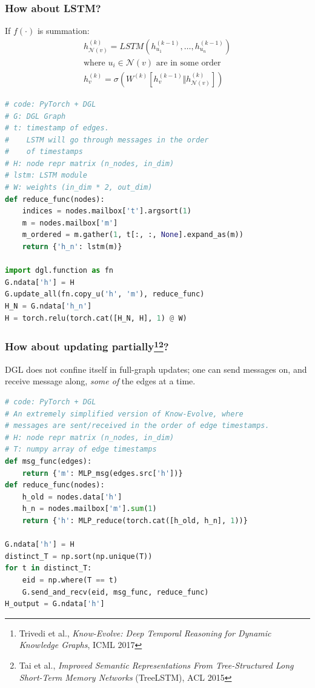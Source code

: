 \documentclass[10pt,aspectratio=169]{beamer}
\begin{document}
	\begin{frame}[fragile]
		\frametitle{How about LSTM?}
		\begin{minipage}{0.4\textwidth}
			If $f(\cdot)$ is summation:
			$$
			\begin{gathered}
			h_{\mathcal{N}(v)}^{(k)} =
			LSTM( h^{(k-1)}_{u_1}, \dots, h^{(k-1)}_{u_n} ) \\
			\text{where } u_i\in \mathcal{N}(v) \text{ are in some order} \\
			h^{(k)}_v =
			\sigma \left( W^{(k)} \left[h_v^{(k-1)} \Vert h_{\mathcal{N}(v)}^{(k)}\right] \right)
			\end{gathered}
			$$
		\end{minipage}\hfill%
		\begin{minipage}{0.5\textwidth}
\begin{lstlisting}[language=Python]
# code: PyTorch + DGL
# G: DGL Graph
# t: timestamp of edges.
#    LSTM will go through messages in the order
#    of timestamps
# H: node repr matrix (n_nodes, in_dim)
# lstm: LSTM module
# W: weights (in_dim * 2, out_dim)
def reduce_func(nodes):
    indices = nodes.mailbox['t'].argsort(1)
    m = nodes.mailbox['m']
    m_ordered = m.gather(1, t[:, :, None].expand_as(m))
    return {'h_n': lstm(m)}

import dgl.function as fn
G.ndata['h'] = H
G.update_all(fn.copy_u('h', 'm'), reduce_func)
H_N = G.ndata['h_n']
H = torch.relu(torch.cat([H_N, H], 1) @ W)
\end{lstlisting}
		\end{minipage}
	\end{frame}

	\begin{frame}[fragile]
		\frametitle{How about updating partially\footnote{Trivedi et al., \emph{Know-Evolve: Deep Temporal Reasoning for Dynamic Knowledge Graphs}, ICML 2017}\footnote{Tai et al., \emph{Improved Semantic Representations From Tree-Structured Long Short-Term Memory Networks}  (TreeLSTM), ACL 2015}?}
		DGL does not confine itself in full-graph updates; one can send messages on, and receive message along, \emph{some of} the edges at a time.
		\begin{center}
			\centering
			\begin{minipage}{0.5\textwidth}
\begin{lstlisting}[language=Python]
# code: PyTorch + DGL
# An extremely simplified version of Know-Evolve, where
# messages are sent/received in the order of edge timestamps.
# H: node repr matrix (n_nodes, in_dim)
# T: numpy array of edge timestamps
def msg_func(edges):
    return {'m': MLP_msg(edges.src['h'])}
def reduce_func(nodes):
    h_old = nodes.data['h']
    h_n = nodes.mailbox['m'].sum(1)
    return {'h': MLP_reduce(torch.cat([h_old, h_n], 1))}

G.ndata['h'] = H
distinct_T = np.sort(np.unique(T))
for t in distinct_T:
    eid = np.where(T == t)
    G.send_and_recv(eid, msg_func, reduce_func)
H_output = G.ndata['h']
\end{lstlisting}
			\end{minipage}
		\end{center}
	\end{frame}
\end{document}
